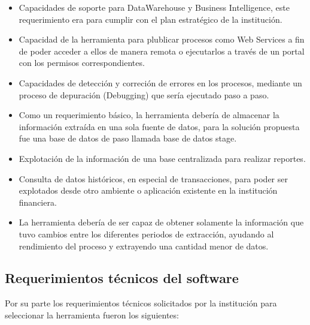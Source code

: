 \begin{itemize}
\item Capacidades de soporte para DataWarehouse y Business Intelligence, este
  requerimiento era para cumplir con el plan estratégico de la institución.

\item Capacidad de la herramienta para plublicar procesos como Web Services a
  fin de poder acceder a ellos de manera remota o ejecutarlos a través de un
  portal con los permisos correspondientes.

\item Capacidades de detección y correción de errores en los procesos, mediante
  un proceso de depuración (Debugging) que sería ejecutado paso a paso.

\item Como un requerimiento básico, la herramienta debería de almacenar la
  información extraída en una sola fuente de datos, para la solución propuesta
  fue una base de datos de paso llamada base de datos stage.

\item Explotación de la información de una base centralizada para realizar
  reportes.

\item Consulta de datos históricos, en especial de transacciones, para poder ser
  explotados desde otro ambiente o aplicación existente en la institución
  financiera.

\item La herramienta debería de ser capaz de obtener solamente la información
  que tuvo cambios entre los diferentes periodos de extracción, ayudando al
  rendimiento del proceso y extrayendo una cantidad menor de datos.
\end{itemize}

\subsection{Requerimientos técnicos del software}

Por su parte los requerimientos técnicos solicitados por la institución para
seleccionar la herramienta fueron los siguientes:

